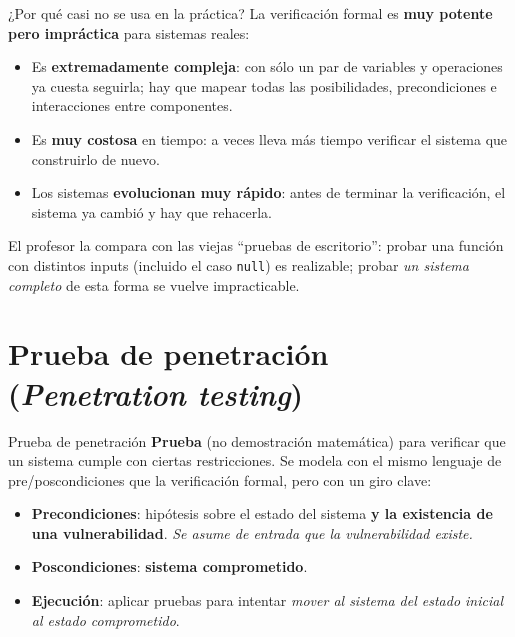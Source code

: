 \documentclass[11pt,a4paper]{article}
\begin{document}
\begin{notebox}{¿Por qué casi no se usa en la práctica?}
La verificación formal es \textbf{muy potente pero impráctica} para sistemas reales:
\begin{itemize}[leftmargin=1.4em,itemsep=1pt]
  \item Es \textbf{extremadamente compleja}: con sólo un par de variables y operaciones ya
        cuesta seguirla; hay que mapear todas las posibilidades, precondiciones e
        interacciones entre componentes.
  \item Es \textbf{muy costosa} en tiempo: a veces lleva más tiempo verificar el sistema que
        construirlo de nuevo.
  \item Los sistemas \textbf{evolucionan muy rápido}: antes de terminar la verificación, el
        sistema ya cambió y hay que rehacerla.
\end{itemize}
El profesor la compara con las viejas ``pruebas de escritorio'': probar una función con
distintos inputs (incluido el caso \texttt{null}) es realizable; probar \emph{un sistema
completo} de esta forma se vuelve impracticable.
\end{notebox}

\section{Prueba de penetración (\textit{Penetration testing})}

\begin{defbox}{Prueba de penetración}
\textbf{Prueba} (no demostración matemática) para verificar que un sistema cumple con ciertas
restricciones. Se modela con el mismo lenguaje de pre/poscondiciones que la verificación
formal, pero con un giro clave:
\begin{itemize}[leftmargin=1.4em,itemsep=2pt]
  \item \textbf{Precondiciones}: hipótesis sobre el estado del sistema \textbf{y la
        existencia de una vulnerabilidad}. \emph{Se asume de entrada que la vulnerabilidad
        existe.}
  \item \textbf{Poscondiciones}: \textbf{sistema comprometido}.
  \item \textbf{Ejecución}: aplicar pruebas para intentar \emph{mover al sistema del estado
        inicial al estado comprometido}.
\end{itemize}
\end{defbox}
\end{document}
